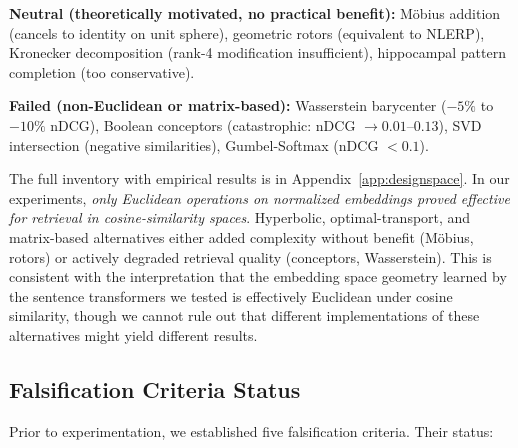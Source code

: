 \documentclass{article}
\begin{document}
\textbf{Neutral (theoretically motivated, no practical benefit):} M\"{o}bius addition (cancels to identity on unit sphere), geometric rotors (equivalent to NLERP), Kronecker decomposition (rank-4 modification insufficient), hippocampal pattern completion (too conservative).

\textbf{Failed (non-Euclidean or matrix-based):} Wasserstein barycenter ($-5\%$ to $-10\%$ nDCG), Boolean conceptors (catastrophic: nDCG $\to 0.01$--$0.13$), SVD intersection (negative similarities), Gumbel-Softmax (nDCG $< 0.1$).

The full inventory with empirical results is in Appendix~\ref{app:designspace}. In our experiments, \emph{only Euclidean operations on normalized embeddings proved effective for retrieval in cosine-similarity spaces}. Hyperbolic, optimal-transport, and matrix-based alternatives either added complexity without benefit (M\"{o}bius, rotors) or actively degraded retrieval quality (conceptors, Wasserstein). This is consistent with the interpretation that the embedding space geometry learned by the sentence transformers we tested is effectively Euclidean under cosine similarity, though we cannot rule out that different implementations of these alternatives might yield different results.

\subsection{Falsification Criteria Status}

Prior to experimentation, we established five falsification criteria. Their status:
\end{document}
